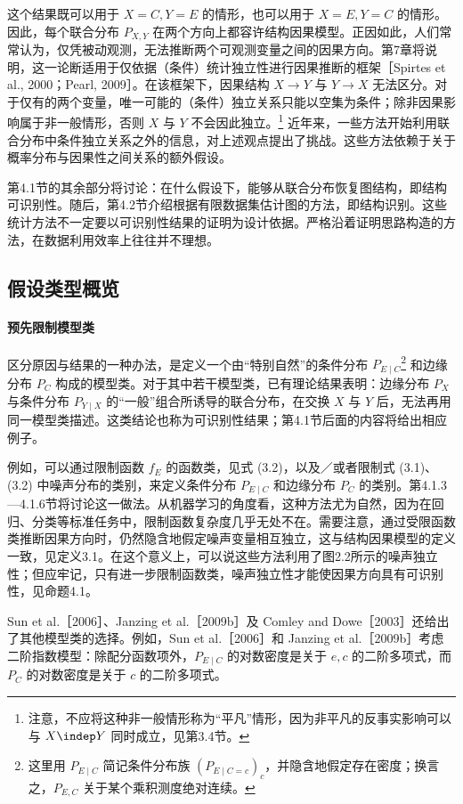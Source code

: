 这个结果既可以用于 $X=C,Y=E$ 的情形，也可以用于 $X=E,Y=C$ 的情形。因此，每个联合分布 $P_{X,Y}$ 在两个方向上都容许结构因果模型。正因如此，人们常常认为，仅凭被动观测，无法推断两个可观测变量之间的因果方向。第7章将说明，这一论断适用于仅依据（条件）统计独立性进行因果推断的框架［Spirtes et al., 2000；Pearl, 2009］。在该框架下，因果结构 $X\to Y$ 与 $Y\to X$ 无法区分。对于仅有的两个变量，唯一可能的（条件）独立关系只能以空集为条件；除非因果影响属于非一般情形，否则 $X$ 与 $Y$ 不会因此独立。\footnote{注意，不应将这种非一般情形称为“平凡”情形，因为非平凡的反事实影响可以与 $X\indep Y$ 同时成立，见第3.4节。}
近年来，一些方法开始利用联合分布中条件独立关系之外的信息，对上述观点提出了挑战。这些方法依赖于关于概率分布与因果性之间关系的额外假设。

第4.1节的其余部分将讨论：在什么假设下，能够从联合分布恢复图结构，即结构可识别性。随后，第4.2节介绍根据有限数据集估计图的方法，即结构识别。这些统计方法不一定要以可识别性结果的证明为设计依据。严格沿着证明思路构造的方法，在数据利用效率上往往并不理想。

\subsection{假设类型概览}

\paragraph{预先限制模型类}
区分原因与结果的一种办法，是定义一个由“特别自然”的条件分布 $P_{E\mid C}$\footnote{这里用 $P_{E\mid C}$ 简记条件分布族 $(P_{E\mid C=c})_c$，并隐含地假定存在密度；换言之，$P_{E,C}$ 关于某个乘积测度绝对连续。}
和边缘分布 $P_C$ 构成的模型类。对于其中若干模型类，已有理论结果表明：边缘分布 $P_X$ 与条件分布 $P_{Y\mid X}$ 的“一般”组合所诱导的联合分布，在交换 $X$ 与 $Y$ 后，无法再用同一模型类描述。这类结论也称为可识别性结果；第4.1节后面的内容将给出相应例子。

例如，可以通过限制函数 $f_E$ 的函数类，见式 (3.2)，以及／或者限制式 (3.1)、(3.2) 中噪声分布的类别，来定义条件分布 $P_{E\mid C}$ 和边缘分布 $P_C$ 的类别。第4.1.3—4.1.6节将讨论这一做法。从机器学习的角度看，这种方法尤为自然，因为在回归、分类等标准任务中，限制函数复杂度几乎无处不在。需要注意，通过受限函数类推断因果方向时，仍然隐含地假定噪声变量相互独立，这与结构因果模型的定义一致，见定义3.1。在这个意义上，可以说这些方法利用了图2.2所示的噪声独立性；但应牢记，只有进一步限制函数类，噪声独立性才能使因果方向具有可识别性，见命题4.1。

Sun et al.［2006］、Janzing et al.［2009b］及 Comley and Dowe［2003］还给出了其他模型类的选择。例如，Sun et al.［2006］和 Janzing et al.［2009b］考虑二阶指数模型：除配分函数项外，$P_{E\mid C}$ 的对数密度是关于 $e,c$ 的二阶多项式，而 $P_C$ 的对数密度是关于 $c$ 的二阶多项式。

